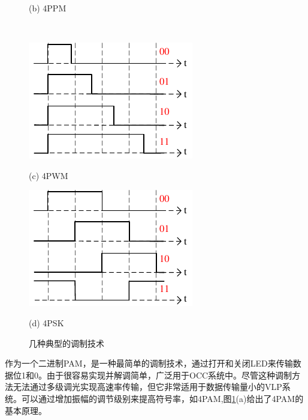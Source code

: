 \begin{figure}[!t]
\begin{minipage}{0.45\linewidth}
    \centerline{(b) 4PPM}
  \end{minipage}\\
\vspace{10pt}
   \begin{minipage}{0.45\linewidth}
    \centerline{\includegraphics[width=\textwidth]{FIG/4PWM.pdf}}
    \centerline{(c) 4PWM}
  \end{minipage}
  \begin{minipage}{0.45\linewidth}
    \centerline{\includegraphics[width=\textwidth]{FIG/4PSK.pdf}}
    \centerline{(d) 4PSK}
  \end{minipage}
  \vfill
  \caption{几种典型的调制技术}
  \label{fig:modulations}
\end{figure}


作为一个二进制PAM，是一种最简单的调制技术，通过打开和关闭LED来传输数据位1和0。由于很容易实现并解调简单，广泛用于OCC系统中。尽管这种调制方法无法通过多级调光实现高速率传输，但它非常适用于数据传输量小的VLP系统。可以通过增加振幅的调节级别来提高符号率，如4PAM,图\ref{fig:modulations}(a)给出了4PAM的基本原理。


